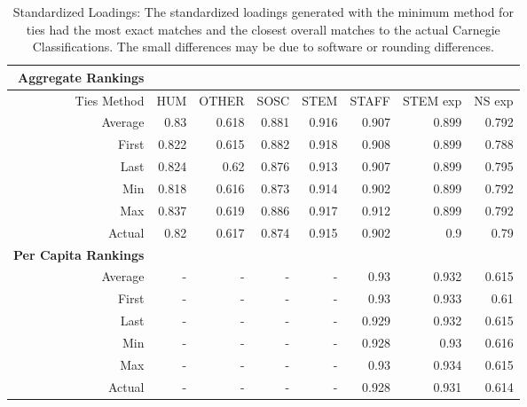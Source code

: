 \documentclass{article}
\begin{document}
\begin{table}[h]
\centering
\begin{tabular}{rrrrrrrr}
	\hline
\textbf{Aggregate Rankings}\\
\hline
Ties Method & HUM &OTHER&SOSC&  STEM & STAFF & STEM exp & NS exp \\
Average     &0.83	&0.618	&0.881	&0.916  &0.907	&0.899	&0.792\\
First       &0.822	&0.615	&0.882	&0.918	&0.908	&0.899	&0.788\\
Last        &0.824	&0.62	&0.876	&0.913	&0.907	&0.899	&0.795\\
Min         &0.818	&0.616	&0.873	&0.914	&0.902	&0.899	&0.792\\
Max         &0.837	&0.619	&0.886	&0.917	&0.912	&0.899	&0.792\\
Actual      &0.82	&0.617	&0.874	&0.915	&0.902	&0.9	&0.79\\
\hline
\textbf{Per Capita Rankings}\\
\hline
Average&-&-	&-	&-  &0.93	&0.932	&0.615\\
First&-&-	&-	&-  &0.93	&0.933	&0.61\\
Last&-&-	&-	&- &0.929	&0.932	&0.615\\
Min&-&-	&-	&-  &0.928	&0.93	&0.616\\
Max&-&-	&-	&-  &0.93	&0.934	&0.615\\
Actual&-&-	&-	&-  &0.928	&0.931	&0.614\\
\hline

\end{tabular}
\caption{\label{tab:ties} Standardized Loadings: The standardized loadings generated with the minimum method for ties had the most exact matches and the closest overall matches to the actual Carnegie Classifications. The small differences may be due to software or rounding differences. }
\end{table}
\end{document}
